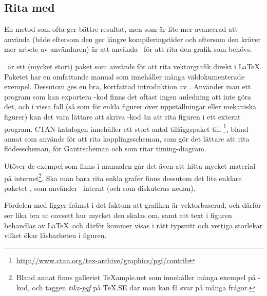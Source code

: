 \documentclass[10pt,../../a4.tex]{subfiles}
\begin{document}
\subsection{Rita med \PGFTikZ}
En metod som ofta ger bättre resultat, men som är lite mer avancerad att
använda (både eftersom den ger längre kompileringstider och eftersom den
kräver mer arbete av användaren) är att använda \PGFTikZ\ för att rita
den grafik som behövs.

\PGFTikZ\ är ett (mycket stort) paket som används för att rita
vektorgrafik direkt i \LaTeX. Paketet har en omfattande manual
\parencite{Tantau10} som innehåller många väldokumenterade exempel.
Dessutom ges en bra, kortfattad introduktion av \textcite{Mertz07}.
Använder man ett program som kan exportera \PGFTikZ-kod finns det oftast
ingen anledning att inte göra det, och i vissa fall (så som för enkla
figurer över uppställningar eller mekaniska figurer) kan det vara 
lättare att skriva \PGFTikZ-kod än att rita figuren i ett externt program.
CTAN-katalogen innehåller ett stort antal tilläggspaket till \PGFTikZ%
\footnote{\url{http://www.ctan.org/tex-archive/graphics/pgf/contrib}%
\protect{}%
},
bland annat  \parencite{Redaelli12} som används
för att rita kopplingsscheman,  \parencite{Robson13}
som gör det lättare att rita flödesscheman, 
\parencite{Skala13} för Ganttscheman och 
\parencite{Scharrer11} som ritar timing-diagram.

Utöver de exempel som finns i manualen går det även att hitta mycket
material på internet\footnote{Bland annat finns galleriet
\TeX{}ample.net som innehåller 
många exempel på \PGFTikZ-kod, och taggen \emph{\mbox{tikz-pgf}} på
\TeX.SE
där man kan få svar på många frågor.}. Ska man bara rita enkla grafer
finns dessutom det lite enklare paketet , som använder
\PGFTikZ\ internt (och som diskuteras nedan).%
%

Fördelen med \PGFTikZ ligger främst i det faktum att grafiken är
vektorbaserad, och därför ser lika bra ut oavsett hur mycket den skalas
om, samt att text i figuren behandlas av \LaTeX\ och därför kommer visas
i rätt typsnitt och vettiga storlekar vilket ökar läsbarheten i figuren.
\end{document}

